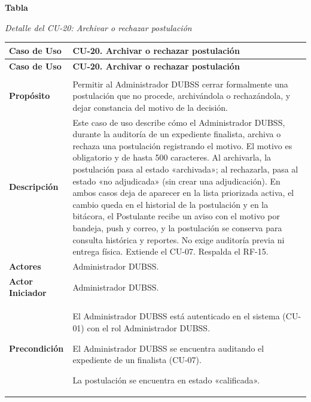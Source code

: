\label{tab:detalle_cu20}
\noindent\textbf{Tabla~\thetable}\par\nopagebreak
\noindent\textit{Detalle del CU-20: Archivar o rechazar postulación}\par\nopagebreak
\begingroup\small\linespread{1}\selectfont
\begin{longtable}{>{\raggedright\arraybackslash}p{2.9cm} >{\raggedright\arraybackslash}p{12.6cm}}
\toprule
\textbf{Caso de Uso} & \textbf{CU-20. Archivar o rechazar postulación} \\
\midrule
\endfirsthead
\toprule
\textbf{Caso de Uso} & \textbf{CU-20. Archivar o rechazar postulación} \\
\midrule
\endhead
\endfoot
\bottomrule
\multicolumn{2}{l}{\textit{Nota.} Elaboración propia.} \\
\endlastfoot
\textbf{Propósito} & Permitir al Administrador DUBSS cerrar formalmente una postulación que no procede, archivándola o rechazándola, y dejar constancia del motivo de la decisión. \\
\midrule
\textbf{Descripción} & Este caso de uso describe cómo el Administrador DUBSS, durante la auditoría de un expediente finalista, archiva o rechaza una postulación registrando el motivo. El motivo es obligatorio y de hasta 500 caracteres. Al archivarla, la postulación pasa al estado «archivada»; al rechazarla, pasa al estado «no adjudicada» (sin crear una adjudicación). En ambos casos deja de aparecer en la lista priorizada activa, el cambio queda en el historial de la postulación y en la bitácora, el Postulante recibe un aviso con el motivo por bandeja, push y correo, y la postulación se conserva para consulta histórica y reportes. No exige auditoría previa ni entrega física. Extiende el CU-07. Respalda el RF-15. \\
\midrule
\textbf{Actores} & Administrador DUBSS. \\
\midrule
\textbf{Actor Iniciador} & Administrador DUBSS. \\
\midrule
\textbf{Precondición} & \vspace{-\baselineskip}\begin{cuvin}
    \item El Administrador DUBSS está autenticado en el sistema (CU-01) con el rol Administrador DUBSS.
    \item El Administrador DUBSS se encuentra auditando el expediente de un finalista (CU-07).
    \item La postulación se encuentra en estado «calificada».

\end{cuvin}
\end{longtable}
